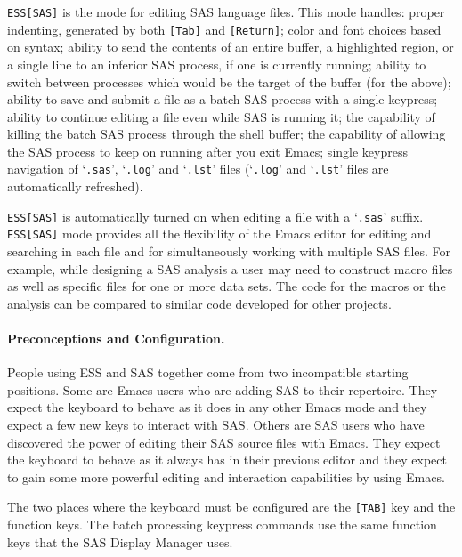 \documentclass{article}
\newcommand{\stexttt}[1]{{\small\texttt{#1}}}
\newcommand{\file}[1]{`\stexttt{#1}'}
\begin{document}
\stexttt{ESS[SAS]} is the mode for editing SAS language files.  This mode
handles: proper indenting, generated by both \stexttt{[Tab]} and
\stexttt{[Return]}; color and font choices based on syntax; ability to send
the contents of an entire buffer, a highlighted region, or a single
line to an inferior SAS process, if one is currently running; ability
to switch between processes which would be the target of the buffer
(for the above); ability to save and submit a file
as a batch SAS process with a single keypress; ability to continue
editing a file even while SAS is running it;
the capability of killing the batch SAS
process through the shell buffer; the capability of allowing the
SAS process to keep on
running after you exit Emacs; single keypress navigation of \file{.sas},
\file{.log} and \file{.lst} files (\file{.log} and \file{.lst}
files are automatically refreshed).

\stexttt{ESS[SAS]} is automatically turned on when editing a file with
a \file{.sas} suffix.  \stexttt{ESS[SAS]} mode provides all the
flexibility of the Emacs editor for editing and searching in each file
and for simultaneously working with multiple SAS files.  For example,
while designing a SAS analysis a user may need to construct macro
files as well as specific files for one or more data sets.  The code
for the macros or the analysis can be compared to similar code
developed for other projects.


\paragraph{Preconceptions and Configuration.}

People using ESS and SAS together come from two incompatible starting positions.
Some are Emacs users who are adding SAS to their repertoire.  They expect the 
keyboard to behave as it does in any other Emacs mode and they expect a few new
keys to interact with SAS.  Others are SAS users who have discovered the
power of editing their SAS source files with Emacs.  They expect the keyboard
to behave as it always has in their previous editor and they expect to gain some
more powerful editing and interaction capabilities by using Emacs.

The two places where the keyboard must be configured are the
\texttt{[TAB]} key and the function keys.  The batch processing
keypress commands use the same function keys that the SAS Display
Manager uses.
\end{document}
